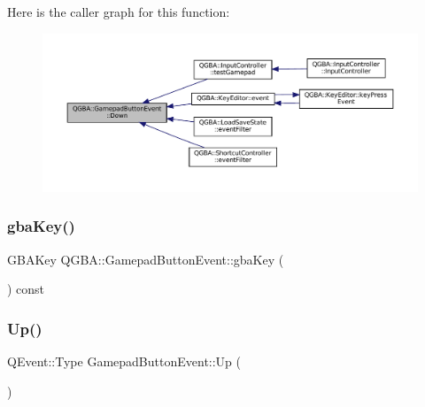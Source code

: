 Here is the caller graph for this function\+:
\nopagebreak
\begin{figure}[H]
\begin{center}
\leavevmode
\includegraphics[width=350pt]{class_q_g_b_a_1_1_gamepad_button_event_a95c6ffc6201926bd3f3feba985dcf2ec_icgraph}
\end{center}
\end{figure}
\mbox{\label{class_q_g_b_a_1_1_gamepad_button_event_a43e724ddf53e2558bd1ea44559dd7e78}} 
\subsubsection{\texorpdfstring{gba\+Key()}{gbaKey()}}
{\footnotesize\ttfamily G\+B\+A\+Key Q\+G\+B\+A\+::\+Gamepad\+Button\+Event\+::gba\+Key (\begin{DoxyParamCaption}{ }\end{DoxyParamCaption}) const\hspace{0.3cm}{\ttfamily [inline]}}

\mbox{\label{class_q_g_b_a_1_1_gamepad_button_event_a27a05c5199de66a176c87c9c3589b909}} 
\subsubsection{\texorpdfstring{Up()}{Up()}}
{\footnotesize\ttfamily Q\+Event\+::\+Type Gamepad\+Button\+Event\+::\+Up (\begin{DoxyParamCaption}{ }\end{DoxyParamCaption})\hspace{0.3cm}{\ttfamily [static]}}

